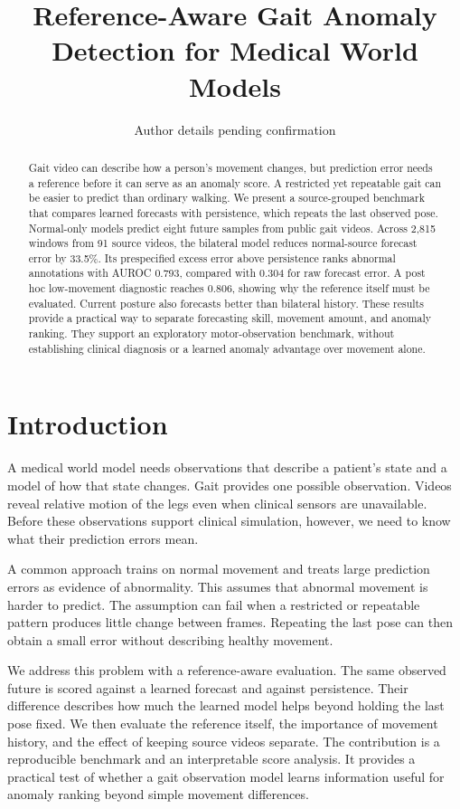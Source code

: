 \documentclass[letterpaper]{article}
\title{Reference-Aware Gait Anomaly Detection for Medical World Models}
\author{Author details pending confirmation}
\begin{document}
\maketitle

\begin{abstract}

Gait video can describe how a person's movement changes, but prediction error needs a reference before it can serve as an anomaly score. A restricted yet repeatable gait can be easier to predict than ordinary walking. We present a source-grouped benchmark that compares learned forecasts with persistence, which repeats the last observed pose. Normal-only models predict eight future samples from public gait videos. Across 2,815 windows from 91 source videos, the bilateral model reduces normal-source forecast error by 33.5\%. Its prespecified excess error above persistence ranks abnormal annotations with AUROC 0.793, compared with 0.304 for raw forecast error. A post hoc low-movement diagnostic reaches 0.806, showing why the reference itself must be evaluated. Current posture also forecasts better than bilateral history. These results provide a practical way to separate forecasting skill, movement amount, and anomaly ranking. They support an exploratory motor-observation benchmark, without establishing clinical diagnosis or a learned anomaly advantage over movement alone.

\end{abstract}

\section{Introduction}

A medical world model needs observations that describe a patient's state and a model of how that state changes. Gait provides one possible observation. Videos reveal relative motion of the legs even when clinical sensors are unavailable. Before these observations support clinical simulation, however, we need to know what their prediction errors mean.

A common approach trains on normal movement and treats large prediction errors as evidence of abnormality. This assumes that abnormal movement is harder to predict. The assumption can fail when a restricted or repeatable pattern produces little change between frames. Repeating the last pose can then obtain a small error without describing healthy movement.

We address this problem with a reference-aware evaluation. The same observed future is scored against a learned forecast and against persistence. Their difference describes how much the learned model helps beyond holding the last pose fixed. We then evaluate the reference itself, the importance of movement history, and the effect of keeping source videos separate. The contribution is a reproducible benchmark and an interpretable score analysis. It provides a practical test of whether a gait observation model learns information useful for anomaly ranking beyond simple movement differences.
\end{document}
